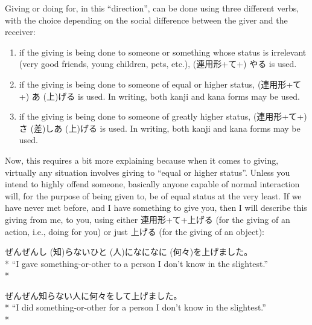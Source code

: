 \documentclass[11pt, b5paper, twoside, openright, onecolumn]{book}
\makeatletter
\newcommand*{\rubystack}[2]{{\relscale{0.5}%
  \begin{tabular}[b]{@{}c@{}}%
    {#1}\\%
   {\textscale{2}{#2}}%
  \end{tabular}}%
}
\DeclareRobustCommand*{\ruby}[2]{%
  \mbox{%
    \setlength{\parskip}{0ex}%
    \BeginAccSupp{method=pdfstringdef,ActualText={#1}}%
      \rubystack{\phantom{#2}}{#1}%
      \llap{%
        \rubystack{#2}{\phantom{#1}}%
      }%
    \EndAccSupp{}%
  }%
}
\renewcommand*{\ruby}[2]{#2 (#1)}%
\newenvironment{exampleblock}{
\setlength{\parindent}{0.6in}
\begin{minipage}[t]{\dimexpr\textwidth-\parindent}}
{\end{minipage}}
\makeatother
\begin{document}
Giving or doing for‚ in this “direction”‚ can be done using three different verbs‚ with the choice depending on the social difference between the giver and the receiver:

\begin{enumerate}
\item if the giving is being done to someone or something whose status is irrelevant (very good friends‚ young children‚ pets‚ etc.)‚ (連用形+て+) やる is used.
\item if the giving is being done to someone of equal or higher status‚ (連用形+て+) \ruby{上}{あ}げる is used. In writing‚ both kanji and kana forms may be used.
\item if the giving is being done to someone of greatly higher status‚ (連用形+て+) \ruby{差}{さ}し\ruby{上}{あ}げる is used. In writing‚ both kanji and kana forms may be used.
\end{enumerate}

Now‚ this requires a bit more explaining because when it comes to giving‚ virtually any situation involves giving to “equal or higher status”. Unless you intend to highly offend someone‚ basically anyone capable of normal interaction will‚ for the purpose of being given to‚ be of equal status at the very least. If we have never met before‚ and I have something to give you‚ then I will describe this giving from me‚ to you‚ using either 連用形+て+上げる (for the giving of an action‚ i.e.‚ doing for you) or just 上げる (for the giving of an object):

\vspace{0.4cm}
\begin{exampleblock}
ぜんぜん\ruby{知}{し}らない\ruby{人}{ひと}に\ruby{何々}{なになに}を上げました。 \\* 
“I gave something-or-other to a person I don’t know in the slightest.” \\* 
\end{exampleblock}
\vspace{0.2cm}

\begin{exampleblock}
ぜんぜん知らない人に何々をして上げました。 \\* 
“I did something-or-other for a person I don’t know in the slightest.” \\* 
\end{exampleblock}
\vspace{0.2cm}
\end{document}
